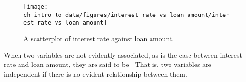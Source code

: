 \begin{figure}
   \centering
   \texttt{[image: ch\_intro\_to\_data/figures/interest\_rate\_vs\_loan\_amount/interest\_rate\_vs\_loan\_amount]}
   \caption{A scatterplot of interest rate against loan amount.}
   \label{interest_rate_vs_loan_amount}
\end{figure}

When two variables are not evidently associated,
as is the case between interest rate and loan amount,
they are said to be .
That is, two variables are independent if there is
no evident relationship between them.
